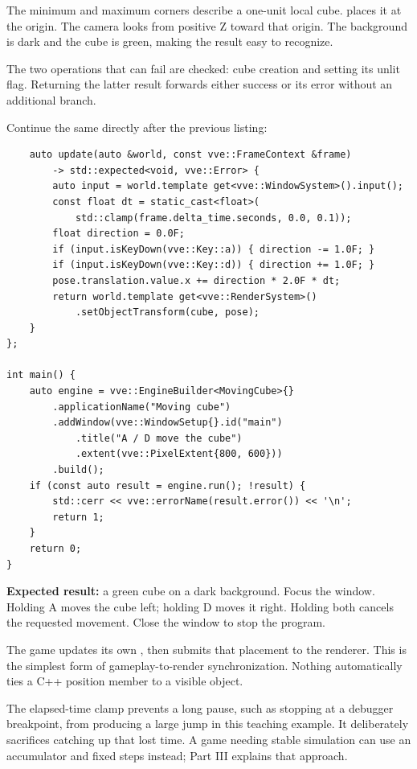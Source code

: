 \documentclass[11pt,a4paper]{article}
\begin{document}
The minimum and maximum corners describe a one-unit local cube.  places it at the origin. The camera looks from positive Z toward that origin. The background is dark and the cube is green, making the result easy to recognize.

The two operations that can fail are checked: cube creation and setting its unlit flag. Returning the latter result forwards either success or its error without an additional branch.

Continue the same  directly after the previous listing:
\begin{lstlisting}
    auto update(auto &world, const vve::FrameContext &frame)
        -> std::expected<void, vve::Error> {
        auto input = world.template get<vve::WindowSystem>().input();
        const float dt = static_cast<float>(
            std::clamp(frame.delta_time.seconds, 0.0, 0.1));
        float direction = 0.0F;
        if (input.isKeyDown(vve::Key::a)) { direction -= 1.0F; }
        if (input.isKeyDown(vve::Key::d)) { direction += 1.0F; }
        pose.translation.value.x += direction * 2.0F * dt;
        return world.template get<vve::RenderSystem>()
            .setObjectTransform(cube, pose);
    }
};

int main() {
    auto engine = vve::EngineBuilder<MovingCube>{}
        .applicationName("Moving cube")
        .addWindow(vve::WindowSetup{}.id("main")
            .title("A / D move the cube")
            .extent(vve::PixelExtent{800, 600}))
        .build();
    if (const auto result = engine.run(); !result) {
        std::cerr << vve::errorName(result.error()) << '\n';
        return 1;
    }
    return 0;
}
\end{lstlisting}
\textbf{Expected result:} a green cube on a dark background. Focus the window. Holding A moves the cube left; holding D moves it right. Holding both cancels the requested movement. Close the window to stop the program.

The game updates its own , then submits that placement to the renderer. This is the simplest form of gameplay-to-render synchronization. Nothing automatically ties a C++ position member to a visible object.

The elapsed-time clamp prevents a long pause, such as stopping at a debugger breakpoint, from producing a large jump in this teaching example. It deliberately sacrifices catching up that lost time. A game needing stable simulation can use an accumulator and fixed steps instead; Part III explains that approach.
\end{document}
